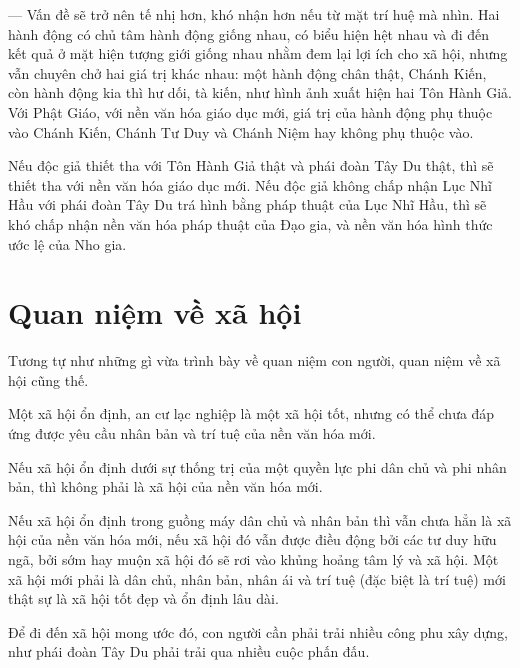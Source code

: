 — Vấn đề sẽ trở nên tế nhị hơn, khó nhận hơn nếu từ mặt trí huệ mà nhìn. Hai hành động có chủ tâm hành động giống nhau, có biểu hiện hệt nhau và đi đến kết quả ở mặt hiện tượng giới giống nhau nhằm đem lại lợi ích cho xã hội, nhưng vẫn chuyên chở hai giá trị khác nhau: một hành động chân thật, Chánh Kiến, còn hành động kia thì hư dối, tà kiến, như hình ảnh xuất hiện hai Tôn Hành Giả. Với Phật Giáo, với nền văn hóa giáo dục mới, giá trị của hành động phụ thuộc vào Chánh Kiến, Chánh Tư Duy và Chánh Niệm hay không phụ thuộc vào.

Nếu độc giả thiết tha với Tôn Hành Giả thật và phái đoàn Tây Du thật, thì sẽ thiết tha với nền văn hóa giáo dục mới. Nếu độc giả không chấp nhận Lục Nhĩ Hầu với phái đoàn Tây Du trá hình bằng pháp thuật của Lục Nhĩ Hầu, thì sẽ khó chấp nhận nền văn hóa pháp thuật của Đạo gia, và nền văn hóa hình thức ước lệ của Nho gia.

\section{Quan niệm về xã hội} %
\label{sec:56_57_xa_hoi}

Tương tự như những gì vừa trình bày về quan niệm con người, quan niệm về xã hội cũng thế.

Một xã hội ổn định, an cư lạc nghiệp là một xã hội tốt, nhưng có thể chưa đáp ứng được yêu cầu nhân bản và trí tuệ của nền văn hóa mới.

Nếu xã hội ổn định dưới sự thống trị của một quyền lực phi dân chủ và phi nhân bản, thì không phải là xã hội của nền văn hóa mới.

Nếu xã hội ổn định trong guồng máy dân chủ và nhân bản thì vẫn chưa hẳn là xã hội của nền văn hóa mới, nếu xã hội đó vẫn được điều động bởi các tư duy hữu ngã, bởi sớm hay muộn xã hội đó sẽ rơi vào khủng hoảng tâm lý và xã hội. Một xã hội mới phải là dân chủ, nhân bản, nhân ái và trí tuệ (đặc biệt là trí tuệ) mới thật sự là xã hội tốt đẹp và ổn định lâu dài.

Để đi đến xã hội mong ước đó, con người cần phải trải nhiều công phu xây dựng, như phái đoàn Tây Du phải trải qua nhiều cuộc phấn đấu.

